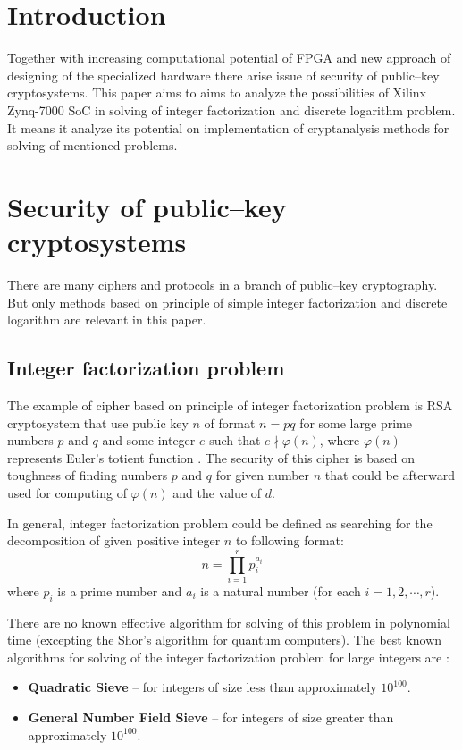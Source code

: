 \documentclass[conference]{IEEEtran}
\begin{document}
\section{Introduction}
Together with increasing computational potential of FPGA and new approach of designing of the specialized hardware there arise issue of security of public--key cryptosystems. This paper aims to aims to analyze the possibilities of Xilinx Zynq-7000 SoC in solving of integer factorization and discrete logarithm problem. It means it analyze its potential on implementation of cryptanalysis methods for solving of mentioned problems. 

\section{Security of public--key cryptosystems}
There are many ciphers and protocols in a branch of public--key cryptography. But only methods based on principle of simple integer factorization and discrete logarithm are relevant in this paper. 

\subsection{Integer factorization problem}
The example of cipher based on principle of integer factorization problem is RSA cryptosystem that use public key $n$ of format $n = pq$ for some large prime numbers $p$ and $q$ and some integer $e$ such that $e \nmid \varphi(n)$, where $\varphi(n)$ represents Euler's totient function \cite{delfs}. The security of this cipher is based on toughness of finding numbers $p$ and $q$ for given number $n$ that could be afterward used for computing of $\varphi(n)$ and the value of $d$. 

In general, integer factorization problem could be defined as searching for the decomposition of given positive integer $n$ to following format:
\begin{equation}
n = \prod_{i = 1}^r p_i^{a_i}
\end{equation}
where $p_i$ is a prime number and $a_i$ is a natural number (for each $i = 1,2,\cdots,r$).

There are no known effective algorithm for solving of this problem in polynomial time (excepting the Shor's algorithm for quantum computers). The best known algorithms for solving of the integer factorization problem for large integers are \cite{yan}:
\begin{itemize}
\item \textbf{Quadratic Sieve} -- for integers of size less than approximately $10^{100}$.
\item \textbf{General Number Field Sieve} -- for integers of size greater than approximately $10^{100}$.
\end{itemize}
\end{document}
